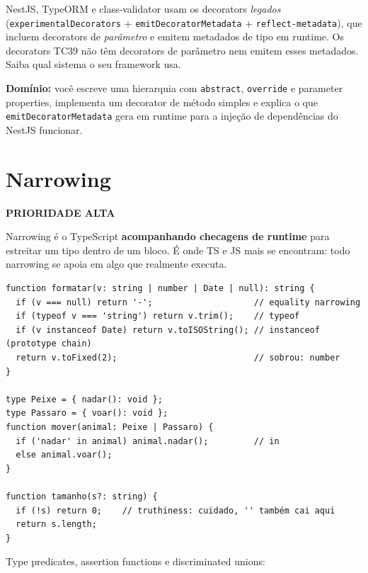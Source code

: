 \documentclass[12pt,a4paper,oneside]{book}
\newcommand{\alta}{\colorbox{red!15}{\sffamily\scriptsize\bfseries PRIORIDADE ALTA}}
\newcommand{\code}[1]{\texttt{#1}}
\newcommand{\dom}[1]{\begin{dominio}\textbf{Domínio:} #1\end{dominio}}
\begin{document}
\begin{cuidado}
NestJS, TypeORM e class-validator usam os decorators \emph{legados} (\code{experimentalDecorators} + \code{emitDecoratorMetadata} + \code{reflect-metadata}), que incluem decorators de \emph{parâmetro} e emitem metadados de tipo em runtime. Os decorators TC39 não têm decorators de parâmetro nem emitem esses metadados. Saiba qual sistema o seu framework usa.
\end{cuidado}

\dom{você escreve uma hierarquia com \code{abstract}, \code{override} e parameter properties, implementa um decorator de método simples e explica o que \code{emitDecoratorMetadata} gera em runtime para a injeção de dependências do NestJS funcionar.}

\section{Narrowing}
\label{sec:narrowing}
\alta

Narrowing é o TypeScript \textbf{acompanhando checagens de runtime} para estreitar um tipo dentro de um bloco. É onde TS e JS mais se encontram: todo narrowing se apoia em algo que realmente executa.

\begin{verbatim}
function formatar(v: string | number | Date | null): string {
  if (v === null) return '-';                    // equality narrowing
  if (typeof v === 'string') return v.trim();    // typeof
  if (v instanceof Date) return v.toISOString(); // instanceof (prototype chain)
  return v.toFixed(2);                           // sobrou: number
}

type Peixe = { nadar(): void };
type Passaro = { voar(): void };
function mover(animal: Peixe | Passaro) {
  if ('nadar' in animal) animal.nadar();         // in
  else animal.voar();
}

function tamanho(s?: string) {
  if (!s) return 0;    // truthiness: cuidado, '' também cai aqui
  return s.length;
}
\end{verbatim}

Type predicates, assertion functions e discriminated unions:
\end{document}
